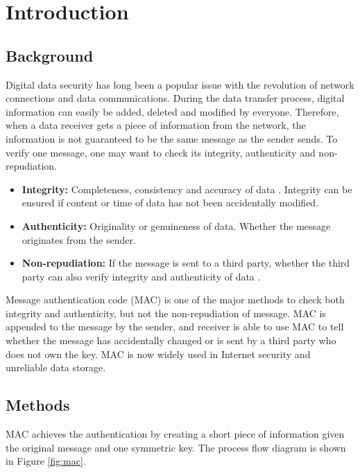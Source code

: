 \section{Introduction}

\subsection{Background}

	Digital data security has long been a popular issue with the revolution of network connections and data communications. During the data transfer process, digital information can easily be added, deleted and modified by everyone. Therefore, when a data receiver gets a piece of information from the network, the information is not guaranteed to be the same message as the sender sends. To verify one message, one may want to check its integrity, authenticity and non-repudiation.

	\begin{itemize}
		\item
			\textbf{Integrity:}
			Completeness, consistency and accuracy of data \cite{integrity}. Integrity can be ensured if content or time of data has not been accidentally modified.
		\item
			\textbf{Authenticity:}
			Originality or genuineness of data. Whether the message originates from the sender.
		\item
			\textbf{Non-repudiation:}
			If the message is sent to a third party, whether the third party can also verify integrity and authenticity of data \cite{non-repu}.
	\end{itemize}

	Message authentication code (MAC) is one of the major methods to check both integrity and authenticity, but not the non-repudiation of message. MAC is appended to the message by the sender, and receiver is able to use MAC to tell whether the message has accidentally changed or is sent by a third party who does not own the key. MAC is now widely used in Internet security and unreliable data storage.

\subsection{Methods}

	MAC achieves the authentication by creating a short piece of information given the original message and one symmetric key. The process flow diagram is shown in Figure \ref{fig:mac}.

